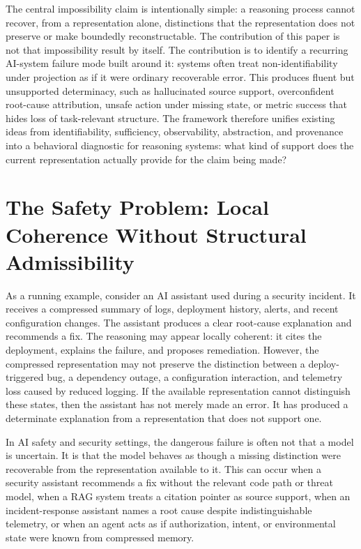 \documentclass[11pt]{article}
\begin{document}
The central impossibility claim is intentionally simple: a reasoning process cannot recover, from a representation alone, distinctions that the representation does not preserve or make boundedly reconstructable. The contribution of this paper is not that impossibility result by itself. The contribution is to identify a recurring AI-system failure mode built around it: systems often treat non-identifiability under projection as if it were ordinary recoverable error. This produces fluent but unsupported determinacy, such as hallucinated source support, overconfident root-cause attribution, unsafe action under missing state, or metric success that hides loss of task-relevant structure. The framework therefore unifies existing ideas from identifiability, sufficiency, observability, abstraction, and provenance into a behavioral diagnostic for reasoning systems: what kind of support does the current representation actually provide for the claim being made?

\section{The Safety Problem: Local Coherence Without Structural Admissibility}

As a running example, consider an AI assistant used during a security incident. It receives a compressed summary of logs, deployment history, alerts, and recent configuration changes. The assistant produces a clear root-cause explanation and recommends a fix. The reasoning may appear locally coherent: it cites the deployment, explains the failure, and proposes remediation. However, the compressed representation may not preserve the distinction between a deploy-triggered bug, a dependency outage, a configuration interaction, and telemetry loss caused by reduced logging. If the available representation cannot distinguish these states, then the assistant has not merely made an error. It has produced a determinate explanation from a representation that does not support one.

In AI safety and security settings, the dangerous failure is often not that a model is uncertain. It is that the model behaves as though a missing distinction were recoverable from the representation available to it. This can occur when a security assistant recommends a fix without the relevant code path or threat model, when a RAG system treats a citation pointer as source support, when an incident-response assistant names a root cause despite indistinguishable telemetry, or when an agent acts as if authorization, intent, or environmental state were known from compressed memory.
\end{document}
